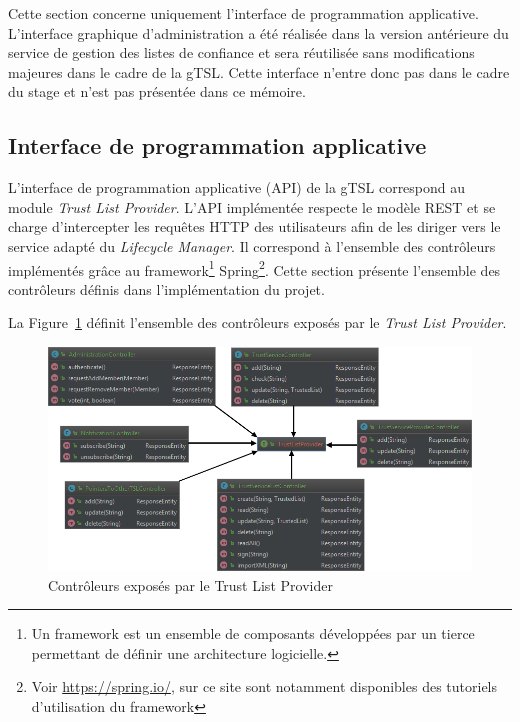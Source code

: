 \documentclass{tnreport}
\begin{document}
Cette section concerne uniquement l'interface de programmation applicative. L'interface graphique d'administration a été réalisée dans la version antérieure du service de gestion des listes de confiance et sera réutilisée sans modifications majeures dans le cadre de la gTSL. Cette interface n'entre donc pas dans le cadre du stage et n'est pas présentée dans ce mémoire.

\subsection{Interface de programmation applicative}

L'interface de programmation applicative (API) de la gTSL correspond au module \textit{Trust List Provider}. L'API implémentée respecte le modèle REST et se charge d'intercepter les requêtes HTTP des utilisateurs afin de les diriger vers le service adapté du \textit{Lifecycle Manager}. Il correspond à l'ensemble des contrôleurs implémentés grâce au framework\footnote{Un framework est un ensemble de composants développées par un tierce permettant de définir une architecture logicielle.} Spring\footnote{Voir \url{https://spring.io/}, sur ce site sont notamment disponibles des tutoriels d'utilisation du framework}. Cette section présente l'ensemble des contrôleurs définis dans l'implémentation du projet.

La Figure~\ref{fig:rest-controllers} définit l'ensemble des contrôleurs exposés par le \textit{Trust List Provider}.

\clearpage
\begin{figure}[h]
	\centering
	\includegraphics[scale=0.73]{figures/rest-controllers}
	\caption{Contrôleurs exposés par le Trust List Provider}
	\label{fig:rest-controllers}
\end{figure}
\end{document}
